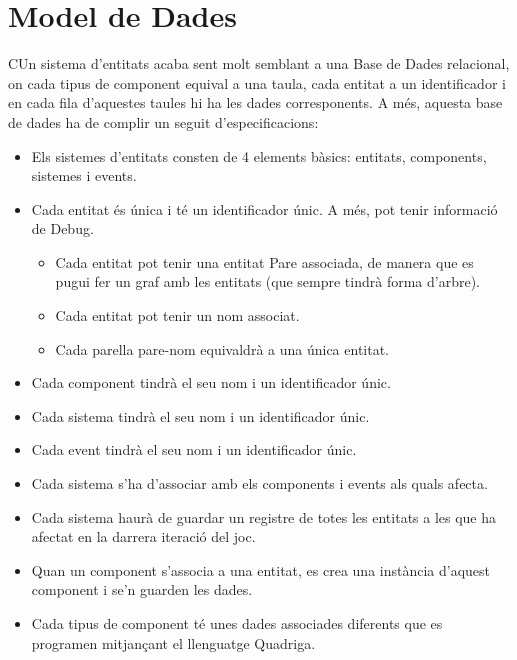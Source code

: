 \section{Model de Dades}

  CUn sistema d'entitats acaba sent molt semblant a una Base de Dades relacional, on cada tipus de component equival a una taula, cada entitat a un identificador i en cada fila d'aquestes taules hi ha les dades corresponents. A més, aquesta base de dades ha de complir un seguit d'especificacions:

  \begin{itemize}
    \item Els sistemes d'entitats consten de 4 elements bàsics: entitats, components, sistemes i events.
    
    \item Cada entitat és única i té un identificador únic. A més, pot tenir informació de Debug.
      \begin{itemize}
        \item Cada entitat pot tenir una entitat Pare associada, de manera que es pugui fer un graf amb les entitats (que sempre tindrà forma d'arbre).
        \item Cada entitat pot tenir un nom associat.
        \item Cada parella pare-nom equivaldrà a una única entitat.
      \end{itemize}
    \item Cada component tindrà el seu nom i un identificador únic.
    
    \item Cada sistema tindrà el seu nom i un identificador únic.
    
    \item Cada event tindrà el seu nom i un identificador únic.
    
    \item Cada sistema s'ha d'associar amb els components i events als quals afecta.
    
    \item Cada sistema haurà de guardar un registre de totes les entitats a les que ha afectat en la darrera iteració del joc.
    
    \item Quan un component s'associa a una entitat, es crea una instància d'aquest component i se'n guarden les dades.
    
    \item Cada tipus de component té unes dades associades diferents que es programen mitjançant el llenguatge Quadriga.
  \end{itemize}

